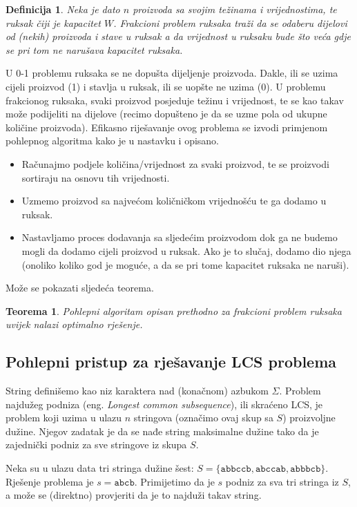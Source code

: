 \documentclass[a4paper, utf8, 11pt, colorlinks]{book}
\newtheorem{definition}{Definicija}
\newtheorem{thm}{Teorema}
\begin{document}
\begin{definition}
  Neka je dato $n$ proizvoda sa svojim  težinama i vrijednostima, 
  te ruksak čiji je kapacitet $W$. Frakcioni problem ruksaka traži da se odaberu dijelovi od (nekih) proizvoda i stave u ruksak a da vrijednost u ruksaku bude što veća gdje se pri tom ne narušava kapacitet ruksaka.
\end{definition}
U 0-1 problemu ruksaka se ne dopušta dijeljenje proizvoda. Dakle, ili se uzima cijeli proizvod (1) i stavlja u ruksak, ili se uopšte ne uzima (0). U  problemu frakcionog ruksaka, svaki proizvod posjeduje težinu i vrijednost, te se kao takav može podijeliti na dijelove (recimo dopušteno je da se uzme   pola od ukupne količine proizvoda). Efikasno riješavanje ovog problema se izvodi primjenom pohlepnog algoritma kako je u nastavku i opisano.
\begin{itemize}
	\item Računajmo podjele količina/vrijednost za svaki proizvod, te se proizvodi  sortiraju na osnovu tih vrijednosti.   \item Uzmemo proizvod sa najvećom količničkom vrijednošću te ga dodamo u ruksak. 
	\item Nastavljamo proces dodavanja sa sljedećim proizvodom dok ga ne budemo mogli da dodamo cijeli proizvod u ruksak.    Ako je to slučaj, dodamo dio njega (onoliko koliko god je moguće, a da se pri tome kapacitet ruksaka ne naruši). 
\end{itemize}
Može se pokazati sljedeća teorema. 

\begin{thm}
      Pohlepni algoritam opisan prethodno za frakcioni problem ruksaka uvijek nalazi optimalno rješenje.
\end{thm}
\subsection{Pohlepni pristup za rješavanje LCS problema}

String definišemo kao niz karaktera nad (konačnom) azbukom $\Sigma$. 
Problem najdužeg podniza (eng. \emph{Longest common subsequence}), ili skraćeno LCS, je problem koji uzima u ulazu  $n$ stringova (označimo ovaj skup sa $S$) proizvoljne dužine. Njegov zadatak je da se nađe string maksimalne dužine tako da je  zajednički podniz za sve stringove iz skupa $S$. 

 Neka su u ulazu data tri stringa dužine šest: $S = \{  \texttt{abbccb}, \texttt{abccab}, \texttt{abbbcb}   \}$. Rješenje problema je $s=\texttt{abcb}$. Primijetimo da je $s$ podniz za sva tri stringa iz $S$, a može se (direktno) provjeriti da je to najduži takav string. 
 
\end{document}
